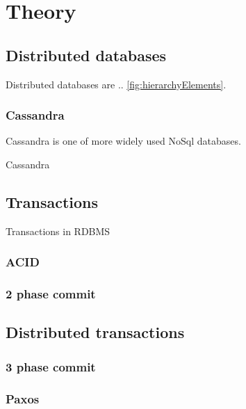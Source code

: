 
\chapter{Theory}\label{chapter:theory}

\section{Distributed databases}\label{sec:theory:distDbs}
Distributed databases are .. \ref{fig:hierarchyElements}. \cite{CassandraDataStaxDocs} \cite{chandra2007PaxosMadeLive} \cite{lamport1982byzantine}

\subsection{Cassandra}
Cassandra is one of more widely used NoSql databases. 

Cassandra


\section{Transactions}\label{sec:theory:transactions}
Transactions in RDBMS

\subsection{ACID}

\subsection{2 phase commit}

\section{Distributed transactions}

\subsection{3 phase commit}

\subsection{Paxos}

